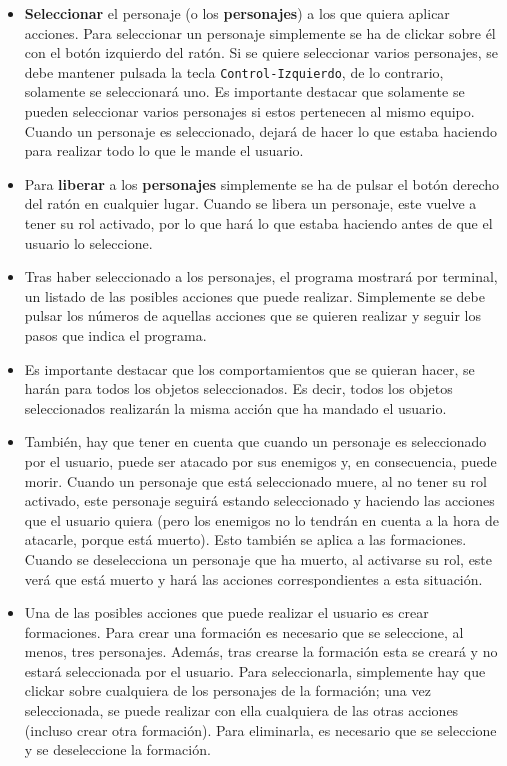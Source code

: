 \begin{itemize}
 \item \textbf{Seleccionar} el personaje (o los \textbf{personajes}) a los que quiera aplicar acciones. Para seleccionar un personaje simplemente se ha de clickar sobre él con el botón izquierdo del ratón. Si se quiere seleccionar varios personajes, se debe mantener pulsada la tecla \texttt{Control-Izquierdo}, de lo contrario, solamente se seleccionará uno. Es importante destacar que solamente se pueden seleccionar varios personajes si estos pertenecen al mismo equipo. Cuando un personaje es seleccionado, dejará de hacer lo que estaba haciendo para realizar todo lo que le mande el usuario.
 
 \item Para \textbf{liberar} a los \textbf{personajes} simplemente se ha de pulsar el botón derecho del ratón en cualquier lugar. Cuando se libera un personaje, este vuelve a tener su rol activado, por lo que hará lo que estaba haciendo antes de que el usuario lo seleccione. 
 
 \item Tras haber seleccionado a los personajes, el programa mostrará por terminal, un listado de las posibles acciones que puede realizar. Simplemente se debe pulsar los números de aquellas acciones que se quieren realizar y seguir los pasos que indica el programa.
 
 \item Es importante destacar que los comportamientos que se quieran hacer, se harán para todos los objetos seleccionados. Es decir, todos los objetos seleccionados realizarán la misma acción que ha mandado el usuario. 
 
 \item También, hay que tener en cuenta que cuando un personaje es seleccionado por el usuario, puede ser atacado por sus enemigos y, en consecuencia, puede morir. Cuando un personaje que está seleccionado muere, al no tener su rol activado, este personaje seguirá estando seleccionado y haciendo las acciones que el usuario quiera (pero los enemigos no lo tendrán en cuenta a la hora de atacarle, porque está muerto). Esto también se aplica a las formaciones. Cuando se deselecciona un personaje que ha muerto, al activarse su rol, este verá que está muerto y hará las acciones correspondientes a esta situación.
 
 \item Una de las posibles acciones que puede realizar el usuario es crear formaciones. Para crear una formación es necesario que se seleccione, al menos, tres personajes. Además, tras crearse la formación esta se creará y no estará seleccionada por el usuario. Para seleccionarla, simplemente hay que clickar sobre cualquiera de los personajes de la formación; una vez seleccionada, se puede realizar con ella cualquiera de las otras acciones (incluso crear otra formación). Para eliminarla, es necesario que se seleccione y se deseleccione la formación.
\end{itemize}

